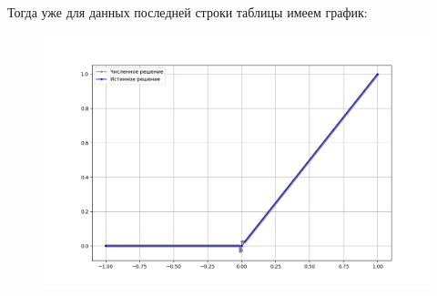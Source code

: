 \documentclass[a4paper,12pt]{article}
\begin{document}
    Тогда уже для данных  последней строки таблицы имеем график:
    \begin{figure}[h]
        \begin{center}
        \begin{minipage}[h]{0.85\linewidth}
        \includegraphics[width=1\linewidth]{Figure_12.png}
        \end{minipage}
        \end{center}
    \end{figure}
    
\end{document}
